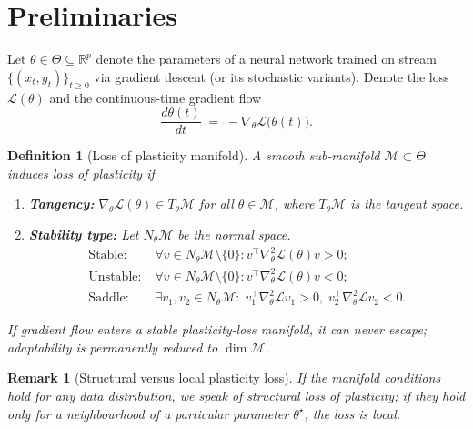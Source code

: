 \documentclass{article}
\newcommand{\Loss}{\mathcal{L}}
\newcommand{\R}{\mathbb{R}}
\newtheorem{definition}{Definition}[section]
\newtheorem{remark}{Remark}[section]
\begin{document}
\section{Preliminaries}
\label{sec:framework}

Let $\theta\in\Theta\subseteq\R^p$ denote the parameters of a neural network trained on stream~$\{(x_t,y_t)\}_{t\ge0}$ via gradient descent (or its stochastic variants).  Denote the loss $\Loss(\theta)$ and the continuous‑time gradient flow
\begin{equation}
    \frac{d\theta(t)}{dt} \;=\; -\nabla_\theta\Loss\bigl(\theta(t)\bigr).
\end{equation}

\begin{definition}[Loss of plasticity manifold]
\label{def:lop}
A smooth sub‑manifold $\mathcal{M}\subset\Theta$ induces loss of plasticity if
\begin{enumerate}[label=(\alph*)]
    \item \textbf{Tangency:} $\nabla_\theta\Loss(\theta)\in T_\theta\mathcal{M}$ for all $\theta\in\mathcal{M}$, where $T_\theta\mathcal{M}$ is the tangent space.
    \item \textbf{Stability type:} Let $N_\theta\mathcal{M}$ be the normal space.  \vspace{-4pt}
        \begin{align}
        \text{Stable:}\; &\forall v\in N_\theta\mathcal{M}\setminus\{0\}: v^\top\nabla_\theta^2\Loss(\theta)v > 0; \\
        \text{Unstable:}\; &\forall v\in N_\theta\mathcal{M}\setminus\{0\}: v^\top\nabla_\theta^2\Loss(\theta)v < 0; \\
        \text{Saddle:}\; &\exists v_1,v_2\in N_\theta\mathcal{M}:\; v_1^\top\nabla_\theta^2\Loss v_1>0,\; v_2^\top\nabla_\theta^2\Loss v_2<0.
        \end{align}
\end{enumerate}
If gradient flow enters a stable plasticity‑loss manifold, it can never escape; adaptability is permanently reduced to $\dim\mathcal{M}$.
\end{definition}

\begin{remark}[Structural versus local plasticity loss]
If the manifold conditions hold for any data distribution, we speak of structural loss of plasticity; if they hold only for a neighbourhood of a particular parameter $\theta^\star$, the loss is local. 
\end{remark}
\end{document}
